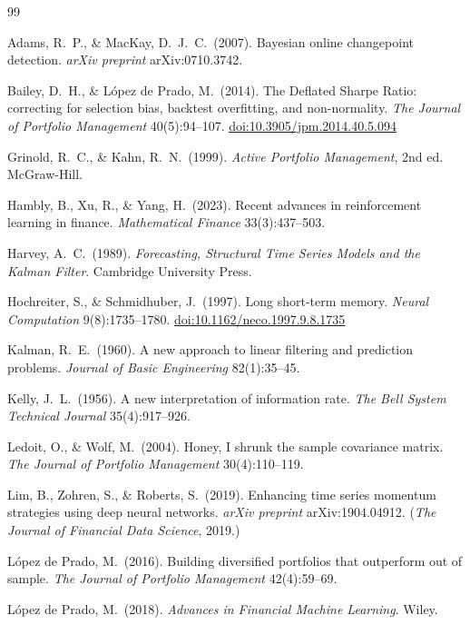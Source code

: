 \documentclass[11pt,a4paper]{article}
\theoremstyle{definition}
\begin{document}
\begin{thebibliography}{99}

 Adams, R.\ P., \& MacKay, D.\ J.\ C.\ (2007). Bayesian online changepoint
detection. \emph{arXiv preprint} arXiv:0710.3742.

 Bailey, D.\ H., \& L\'opez de Prado, M.\ (2014). The Deflated Sharpe Ratio:
correcting for selection bias, backtest overfitting, and non-normality. \emph{The Journal of
Portfolio Management} 40(5):94--107.
\href{https://doi.org/10.3905/jpm.2014.40.5.094}{doi:10.3905/jpm.2014.40.5.094}

 Grinold, R.\ C., \& Kahn, R.\ N.\ (1999). \emph{Active Portfolio Management},
2nd ed. McGraw-Hill.

 Hambly, B., Xu, R., \& Yang, H.\ (2023). Recent advances in reinforcement
learning in finance. \emph{Mathematical Finance} 33(3):437--503.

 Harvey, A.\ C.\ (1989). \emph{Forecasting, Structural Time Series Models and
the Kalman Filter}. Cambridge University Press.

 Hochreiter, S., \& Schmidhuber, J.\ (1997). Long short-term memory.
\emph{Neural Computation} 9(8):1735--1780.
\href{https://doi.org/10.1162/neco.1997.9.8.1735}{doi:10.1162/neco.1997.9.8.1735}

 Kalman, R.\ E.\ (1960). A new approach to linear filtering and prediction
problems. \emph{Journal of Basic Engineering} 82(1):35--45.

 Kelly, J.\ L.\ (1956). A new interpretation of information rate. \emph{The Bell
System Technical Journal} 35(4):917--926.

 Ledoit, O., \& Wolf, M.\ (2004). Honey, I shrunk the sample covariance matrix.
\emph{The Journal of Portfolio Management} 30(4):110--119.

 Lim, B., Zohren, S., \& Roberts, S.\ (2019). Enhancing time series momentum
strategies using deep neural networks. \emph{arXiv preprint} arXiv:1904.04912. (\emph{The Journal
of Financial Data Science}, 2019.)

 L\'opez de Prado, M.\ (2016). Building diversified portfolios that outperform out
of sample. \emph{The Journal of Portfolio Management} 42(4):59--69.

 L\'opez de Prado, M.\ (2018). \emph{Advances in Financial Machine
Learning}. Wiley.


\end{thebibliography}
\end{document}
